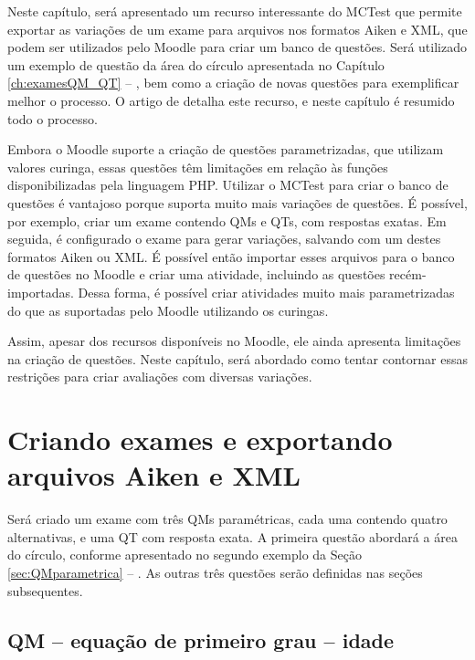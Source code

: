  \label{ch:examesQM_QT_Moodle}

Neste capítulo, será apresentado um recurso interessante do MCTest que permite exportar as variações de um exame para arquivos nos formatos Aiken e XML, que podem ser utilizados pelo Moodle para criar um banco de questões. Será utilizado um exemplo de questão da área do círculo apresentada no Capítulo \ref{ch:examesQM_QT} -- , bem como a criação de novas questões para exemplificar melhor o processo. O artigo de  detalha este recurso, e neste capítulo é resumido todo o processo.

Embora o Moodle suporte a criação de questões parametrizadas, que utilizam valores curinga, essas questões têm limitações em relação às funções disponibilizadas pela linguagem PHP. Utilizar o MCTest para criar o banco de questões é vantajoso porque suporta muito mais variações de questões. É possível, por exemplo, criar um exame contendo QMs e QTs, com respostas exatas. Em seguida, é configurado o exame para gerar variações, salvando com um destes formatos Aiken ou XML. É possível então importar esses arquivos para o banco de questões no Moodle e criar uma atividade, incluindo as questões recém-importadas. Dessa forma, é possível criar atividades muito mais parametrizadas do que as suportadas pelo Moodle utilizando os curingas.

Assim, apesar dos recursos disponíveis no Moodle, ele ainda apresenta limitações na criação de questões. Neste capítulo, será abordado como tentar contornar essas restrições para criar avaliações com diversas variações.

\section{Criando exames e exportando arquivos Aiken e XML}

Será criado um exame com três QMs paramétricas, cada uma contendo quatro alternativas, e uma QT com resposta exata. A primeira questão abordará a área do círculo, conforme apresentado no segundo exemplo da Seção \ref{sec:QMparametrica} -- . As outras três questões serão definidas nas seções subsequentes.

\subsection{QM -- equação de primeiro grau -- idade}

